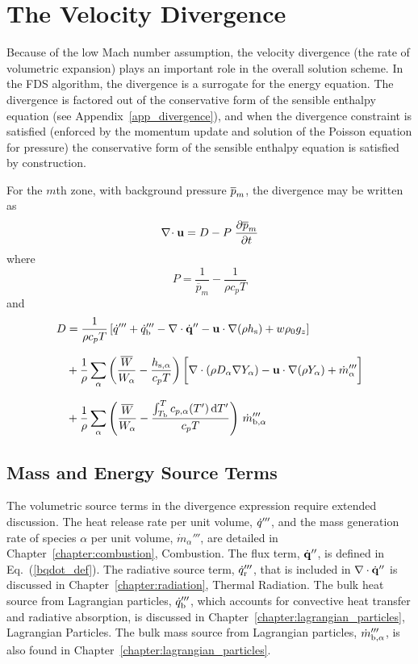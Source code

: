 \section{The Velocity Divergence}
\label{sec:the_velocity_divergence}

Because of the low Mach number assumption, the velocity divergence (the rate of volumetric expansion) plays an important role in the overall solution scheme.  In the FDS algorithm, the divergence is a surrogate for the energy equation.  The divergence is factored out of the conservative form of the sensible enthalpy equation (see Appendix~\ref{app_divergence}), and when the divergence constraint is satisfied (enforced by the momentum update and solution of the Poisson equation for pressure) the conservative form of the sensible enthalpy equation is satisfied by construction.

For the $m$th zone, with background pressure $\overline{p}_m$, the divergence may be written as
\begin{equation}
\label{eqn_divfromeos}
\nabla\!\cdot {\mathbf{u}} = {D} - {P}\; \frac{\partial \overline{p}_m}{\partial t}
\end{equation}
where
\begin{equation}
\label{eqn_fdsP1}
P = \frac{1}{\overline{p}_m} - \frac{1}{\rho c_p T}
\end{equation}
and
\begin{align}
\label{eqn_fdsD1}
D &= \frac{1}{\rho c_p T}\left[ \dot{q}^{\prime\prime\prime} + \dot{q}_{\rm b}^{\prime\prime\prime} - \nabla\cdot \dot{\mathbf{q}}^{\prime\prime} - \mathbf{u} \cdot\nabla (\rho h_{\rm s}) + w \rho_0 g_z\right] \notag\\[.1in]
&+ \frac{1}{\rho} \sum_\alpha \left(\frac{\overline{W}}{W_\alpha} - \frac{h_{\rm s,\alpha}}{c_p T} \right) \bigg[ \nabla\cdot (\rho D_\alpha \nabla Y_\alpha) - \mathbf{u} \cdot \nabla (\rho Y_\alpha) +\dot{m}_\alpha^{\prime\prime\prime}  \bigg] \notag \\[.1in]
&+ \frac{1}{\rho} \sum_\alpha \left(\frac{\overline{W}}{W_\alpha} - \frac{\int_{T_{\rm b}}^T c_{p,\alpha}(T') \, {\rm d}T'}{c_p T} \right) \, \dot{m}_{\rm b,\alpha}^{\prime\prime\prime}
\end{align}

\subsection{Mass and Energy Source Terms}
\label{div_source_terms}

The volumetric source terms in the divergence expression require extended discussion.  The heat release rate per unit volume, $\dot{q}'''$, and the mass generation rate of species $\alpha$ per unit volume, $\dot{m}_\alpha'''$, are detailed in Chapter~\ref{chapter:combustion}, Combustion. The flux term, $\dot{\mathbf{q}}^{\prime\prime}$, is defined in Eq.~(\ref{bqdot_def}). The radiative source term, $\dot{q}_{\rm r}'''$, that is included in $\nabla \cdot \dot{\mathbf{q}}^{\prime\prime}$ is discussed in Chapter~\ref{chapter:radiation}, Thermal Radiation.  The bulk heat source from Lagrangian particles, $\dot{q}_{\rm b}'''$, which accounts for convective heat transfer and radiative absorption, is discussed in Chapter~\ref{chapter:lagrangian_particles}, Lagrangian Particles.  The bulk mass source from Lagrangian particles, $\dot{m}_{\rm b,\alpha}'''$, is also found in Chapter~\ref{chapter:lagrangian_particles}.

